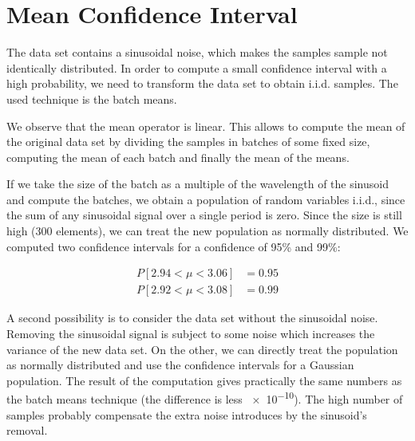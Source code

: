 \section{Mean Confidence Interval}
\label{sec:confidence}

The data set contains a sinusoidal noise, which makes the samples sample not identically distributed.
In order to compute a small confidence interval with a high probability, we need to transform the data set to obtain \ac{i.i.d.} samples.
The used technique is the batch means.

We observe that the mean operator is linear. This allows to compute the mean of the original data set by dividing the samples in batches of some fixed size, computing the mean of each batch and finally the mean of the means.

If we take the size of the batch as a multiple of the wavelength of the sinusoid and compute the batches, we obtain a population of random variables \ac{i.i.d.}, since the sum of any sinusoidal signal over a single period is zero.
Since the size is still high (\num{300} elements), we can treat the new population as normally distributed.
We computed two confidence intervals for a confidence of \num{95}\% and \num{99}\%:

\begin{equation}
    \begin{split}
        P[2.94 < \mu < 3.06] &= 0.95 \\
        P[2.92 < \mu < 3.08] &= 0.99    
    \end{split}
    \label{eq:confidence}
\end{equation}

A second possibility is to consider the data set without the sinusoidal noise.
Removing the sinusoidal signal is subject to some noise which increases the variance of the new data set.
On the other, we can directly treat the population as normally distributed and use the confidence intervals for a Gaussian population.
The result of the computation gives practically the same numbers as the batch means technique (the difference is less \num{e-10}).
The high number of samples probably compensate the extra noise introduces by the sinusoid's removal.
